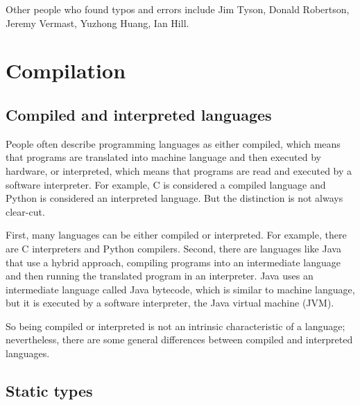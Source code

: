 \documentclass[12pt]{book}
\begin{document}
Other people who found typos and errors include
Jim Tyson, Donald Robertson, Jeremy Vermast, Yuzhong Huang, Ian Hill.

\normalsize

\clearemptydoublepage

\begin{latexonly}

\tableofcontents

\clearemptydoublepage

\newcommand{\vb}{\verb}%}

\end{latexonly}

\mainmatter


\chapter{Compilation}


\section{Compiled and interpreted languages}

People often describe programming languages as either compiled,
which means that programs are translated into machine language and
then executed by hardware, or interpreted, which means that programs
are read and executed by a software interpreter.
For example, C is considered a compiled language and Python is
considered an interpreted language.  But the distinction is not always
clear-cut.

First, many languages can be either compiled or interpreted.  For
example, there are C interpreters and Python compilers.
Second, there are languages like Java that use a hybrid
approach, compiling programs into an intermediate language and then
running the translated program in an interpreter.  Java uses an
intermediate language called Java bytecode, which is similar to
machine language, but it is executed by a software interpreter, the
Java virtual machine (JVM).

So being compiled or interpreted is not an intrinsic
characteristic of a language; nevertheless, there are some general
differences between compiled and interpreted languages.


\section{Static types}
\end{document}
